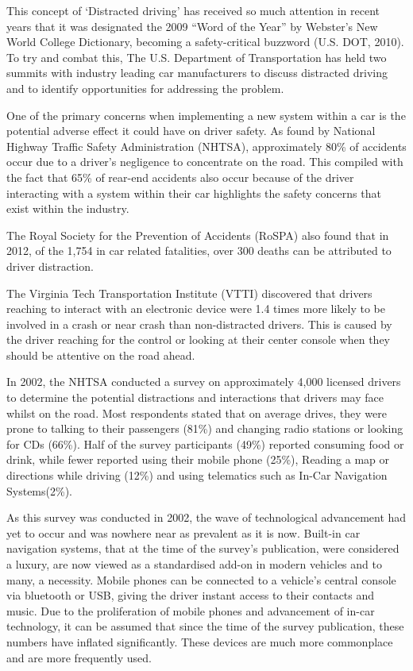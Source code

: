 \documentclass{l4proj}
\begin{document}
This concept of `Distracted driving' has received so much attention in recent years that it was designated the 2009 “Word of the Year” by Webster’s New World College Dictionary, becoming a safety-critical buzzword (U.S. DOT, 2010). To try and combat this, The U.S. Department of Transportation has held two summits with industry leading car manufacturers to discuss distracted driving and to identify opportunities for addressing the problem.

One of the primary concerns when implementing a new system within a car is the potential adverse effect it could have on driver safety. As found by National Highway Traffic Safety Administration (NHTSA), approximately 80\% of accidents occur due to a driver's negligence to concentrate on the road\cite{NHTSA}. This compiled with the fact that 65\% of rear-end accidents also occur because of the driver interacting with a system within their car highlights the safety concerns that exist within the industry.

The Royal Society for the Prevention of Accidents (RoSPA) also found that in 2012, of the 1,754 in car related fatalities, over 300 deaths can be attributed to driver distraction\cite{RoSPA}.  

The Virginia Tech Transportation Institute (VTTI) discovered\cite{VTTI} that drivers reaching to interact with an electronic device were 1.4 times more likely to be involved in a crash or near crash than non-distracted drivers. This is caused by the driver reaching for the control or looking at their center console when they should be attentive on the road ahead. 

In 2002, the NHTSA conducted a survey \cite{Royal} on approximately 4,000 licensed drivers to determine the potential distractions and interactions that drivers may face whilst on the road. Most respondents stated that on average drives, they were prone to talking to their passengers (81\%) and changing radio stations or looking for CDs (66\%). Half of the survey participants (49\%) reported consuming food or drink, while fewer reported using their mobile phone 
(25\%), Reading a map or directions while driving (12\%) and using telematics such as In-Car Navigation Systems(2\%).

As this survey was conducted in 2002, the wave of technological advancement had yet to occur and was nowhere near as prevalent as it is now. Built-in car navigation systems, that at the time of the survey's publication, were considered a luxury, are now viewed as a standardised add-on in modern vehicles and to many, a necessity. Mobile phones can be connected to a vehicle's central console via bluetooth or USB, giving the driver instant access to their contacts and music. Due to the proliferation of mobile phones and advancement of in-car technology, it can be assumed that since the time of the survey publication, these numbers have inflated significantly. These devices are much more commonplace and are more frequently used.
\end{document}
